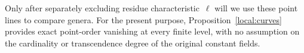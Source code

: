 Only after separately excluding residue characteristic~$\ell$ will
we use these point lines to compare genera.  For the present purpose,
Proposition~\ref{local:curves} provides exact point-order vanishing
at every finite level, with no assumption on the cardinality or
transcendence degree of the original constant fields.
